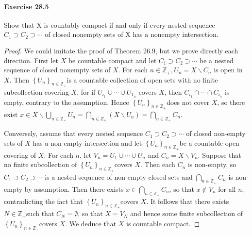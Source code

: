 \documentclass{article}
\begin{document}
\paragraph{Exercise 28.5} Show that X is countably compact if and only if every nested sequence $C_1 \supset C_2 \supset \cdots$ of closed nonempty sets of X has a nonempty intersection.
\begin{proof}
We could imitate the proof of Theorem 26.9, but we prove directly each direction. First let $X$ be countable compact and let $C_1 \supset C_2 \supset \cdots$ be a nested sequence of closed nonempty sets of $X$. For each $n \in \mathbb{Z}_{+}, U_n=X \backslash C_n$ is open in $X$. Then $\left\{U_n\right\}_{n \in \mathbb{Z}_{+}}$is a countable collection of open sets with no finite subcollection covering $X$, for if $U_{i_1} \cup \cdots \cup U_{1_n}$ covers $X$, then $C_{i_1} \cap \cdots \cap C_{i_n}$ is empty, contrary to the assumption. Hence $\left\{U_n\right\}_{n \in \mathbb{Z}_{+}}$does not cover $X$, so there exist $x \in X \backslash \bigcup_{n \in \mathbb{Z}_{+}} U_n=\bigcap_{n \in Z_{+}}\left(X \backslash U_n\right)=\bigcap_{n \in Z_{+}} C_n$.

Conversely, assume that every nested sequence $C_1 \supset C_2 \supset \cdots$ of closed non-empty sets of $X$ has a non-empty intersection and let $\left\{U_n\right\}_{n \in \mathbb{Z}_{+}}$be a countable open covering of $X$. For each $n$, let $V_n=U_1 \cup \cdots \cup U_n$ and $C_n=X \backslash V_n$. Suppose that no finite subcollection of $\left\{U_n\right\}_{n \in \mathbb{Z}_{+}}$covers $X$. Then each $C_n$ is non-empty, so $C_1 \supset C_2 \supset \cdots$ is a nested sequence of non-empty closed sets and $\bigcap_{n \in \mathbb{Z}_{+}} C_n$ is non-empty by assumption. Then there exists $x \in \bigcap_{n \in \mathbb{Z}_{+}} C_n$, so that $x \notin V_n$ for all $n$, contradicting the fact that $\left\{U_n\right\}_{n \in \mathbb{Z}_{+}}$covers $X$. It follows that there exists $N \in \mathbb{Z}_{+}$such that $C_N=\emptyset$, so that $X=V_N$ and hence some finite subcollection of $\left\{U_n\right\}_{n \in \mathbb{Z}_{+}}$covers $X$. We deduce that $X$ is countable compact.
\end{proof}
\end{document}
